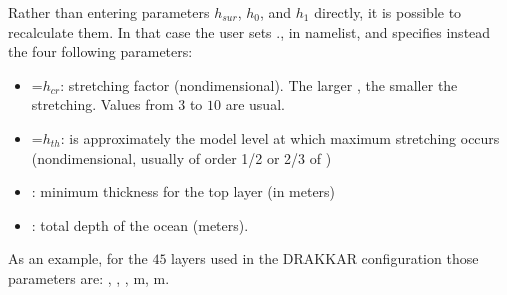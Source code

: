 \documentclass[../tex_main/NEMO_manual]{subfiles}
\begin{document}
Rather than entering parameters $h_{sur}$, $h_{0}$, and $h_{1}$ directly, it is 
possible to recalculate them. In that case the user sets 
\forcode{ = }\forcode{ = }., in  namelist, 
and specifies instead the four following parameters:
\begin{itemize}
\item 	{}=$h_{cr} $: stretching factor (nondimensional). The larger 
, the smaller the stretching. Values from $3$ to $10$ are usual.
\item 	{}=$h_{th} $: is approximately the model level at which maximum 
stretching occurs (nondimensional, usually of order 1/2 or 2/3 of )
\item 	{}: minimum thickness for the top layer (in meters)
\item 	{}: total depth of the ocean (meters).
\end{itemize}
As an example, for the $45$ layers used in the DRAKKAR configuration those 
parameters are: , , , m, m.
\end{document}
